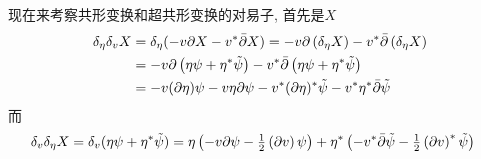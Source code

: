 \begin{tcolorbox}
现在来考察共形变换和超共形变换的对易子, 首先是$X$%
\begin{align*}
\delta _{\eta }\delta _{v}X &=\delta _{\eta }(-v\partial X-v^{\ast }\bar{%
\partial}X)=-v\partial \left( \delta _{\eta }X\right) -v^{\ast }\bar{\partial%
}\left( \delta _{\eta }X\right)  \\
&=-v\partial \left( \eta \psi +\eta ^{\ast }\tilde{\psi}\right) -v^{\ast }%
\bar{\partial}\left( \eta \psi +\eta ^{\ast }\tilde{\psi}\right)  \\
&=-v(\partial \eta )\psi -v\eta \partial \psi -v^{\ast }(\partial \eta
)^{\ast }\tilde{\psi}-v^{\ast }\eta ^{\ast }\bar{\partial}\tilde{\psi}
\end{align*}%
而
\begin{align*}
\delta _{v}\delta _{\eta }X &=\delta _{v}(\eta \psi +\eta ^{\ast }\tilde{%
\psi})=\eta \left( -v\partial \psi -\tfrac{1}{2}\left( \partial v\right) \psi
\right) +\eta ^{\ast }\left( -v^{\ast }\bar{\partial}\tilde{\psi}-\tfrac{1}{2}%
\left( \partial v\right) ^{\ast }\tilde{\psi}\right)
\end{align*}%
\end{tcolorbox}
